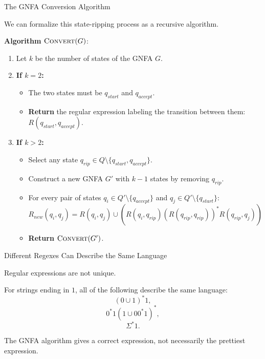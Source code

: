 \documentclass[10pt,aspectratio=169]{beamer}
\begin{document}
\begin{frame}{The GNFA Conversion Algorithm}

We can formalize this state-ripping process as a recursive algorithm.

\vspace{0.8em}
\textbf{Algorithm} $\text{\textsc{Convert}}(G)$:
\begin{enumerate}
    \item Let $k$ be the number of states of the GNFA $G$.
    \item \textbf{If $k = 2$:}
    \begin{itemize}
        \item The two states must be $q_{start}$ and $q_{accept}$. 
        \item \textbf{Return} the regular expression labeling the transition between them: $R(q_{start}, q_{accept})$.
    \end{itemize}
    \item \textbf{If $k > 2$:}
    \begin{itemize}
        \item Select any state $q_{rip} \in Q \setminus \{q_{start}, q_{accept}\}$.
        \item Construct a new GNFA $G'$ with $k-1$ states by removing $q_{rip}$.
        \item For every pair of states $q_i \in Q' \setminus \{q_{accept}\}$ and $q_j \in Q' \setminus \{q_{start}\}$:
        \[
        R_{new}(q_i, q_j) = R(q_i, q_j) \cup \left( R(q_i, q_{rip}) (R(q_{rip}, q_{rip}))^* R(q_{rip}, q_j) \right)
        \]
        \item \textbf{Return} $\text{\textsc{Convert}}(G')$.
    \end{itemize}
\end{enumerate}

\end{frame}


\begin{frame}{Different Regexes Can Describe the Same Language}

Regular expressions are not unique.

\vspace{0.8em}
For strings ending in $1$, all of the following describe the same language:
\[
(0\cup1)^*1,
\]
\[
0^*1(1\cup 00^*1)^*,
\]
\[
\Sigma^*1.
\]

\vspace{0.8em}
The GNFA algorithm gives a correct expression, not necessarily the prettiest expression.

\end{frame}
\end{document}

